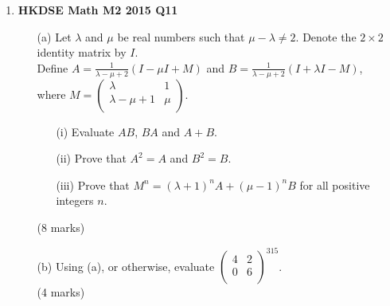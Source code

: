 \documentclass[12pt]{article}
\begin{document}
\begin{enumerate}
	\item \textbf{HKDSE Math M2 2015 Q11}
	\begin{enumerate}
		\item [(a)]Let $\lambda$ and $\mu$ be real numbers such that $\mu - \lambda \neq 2$. Denote the $2 \times 2$ identity matrix by $I$.\\Define $\displaystyle A = \frac{1}{\lambda - \mu + 2} (I - \mu I + M)$ and $\displaystyle B = \frac{1}{\lambda - \mu + 2} (I +\lambda  I - M)$, \\where $M = \begin{pmatrix}
			\lambda & 1 \\ \lambda - \mu + 1 & \mu \\
		\end{pmatrix}$. 
		\begin{enumerate}
			\item [(i)]Evaluate $AB$, $BA$ and $A+B$. 
			\item [(ii)]Prove that $A^2 = A$ and $B^2 = B$. 
			\item [(iii)]Prove that $M^n = (\lambda + 1)^nA + (\mu -1)^n B$ for all positive integers $n$.
		\end{enumerate}
		(8 marks)
		\item [(b)]Using (a), or otherwise, evaluate $\begin{pmatrix}
			4&2\\0&6\\
		\end{pmatrix}^{315}$. \\(4 marks)
	\end{enumerate}
	

\end{enumerate}
\end{document}

